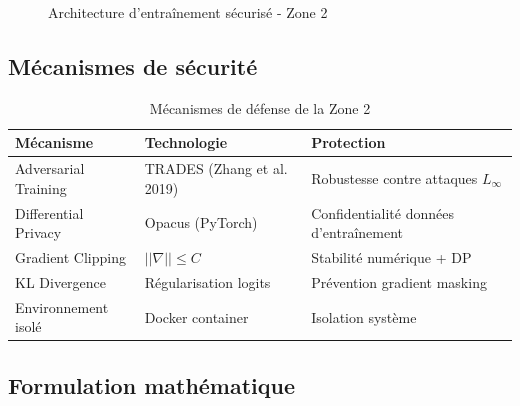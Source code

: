 \documentclass[11pt,a4paper]{article}
\begin{document}
\begin{figure}[h!]
\caption{Architecture d'entraînement sécurisé - Zone 2}
\label{fig:zone2_training}
\end{figure}

\subsection{Mécanismes de sécurité}

\begin{table}[h!]
\centering
\caption{Mécanismes de défense de la Zone 2}
\label{tab:zone2_defenses}
\begin{tabularx}{\textwidth}{|l|X|X|}
\hline
\textbf{Mécanisme} & \textbf{Technologie} & \textbf{Protection} \\ \hline
Adversarial Training & TRADES (Zhang et al. 2019) & Robustesse contre attaques $L_\infty$ \\ \hline
Differential Privacy & Opacus (PyTorch) & Confidentialité données d'entraînement \\ \hline
Gradient Clipping & $||\nabla|| \leq C$ & Stabilité numérique + DP \\ \hline
KL Divergence & Régularisation logits & Prévention gradient masking \\ \hline
Environnement isolé & Docker container & Isolation système \\ \hline
\end{tabularx}
\end{table}

\subsection{Formulation mathématique}
\end{document}
